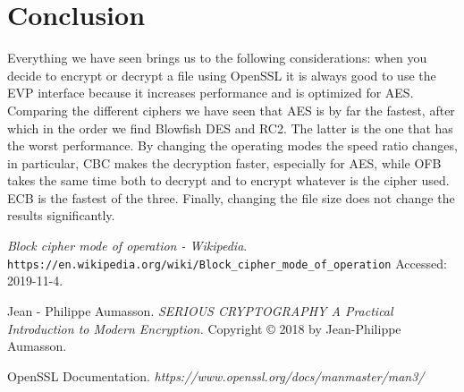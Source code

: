 \documentclass[11pt]{article}
\begin{document}
\newpage
\section{Conclusion}
Everything we have seen brings us to the following considerations: when you decide to encrypt or decrypt a file using OpenSSL it is always 
good to use the EVP interface because it increases performance and is optimized for AES.
Comparing the different ciphers we have seen that AES is by far the fastest, after which in the order we find Blowfish DES and RC2. 
The latter is the one that has the worst performance. By changing the operating modes the speed ratio changes, in particular, CBC makes 
the decryption faster, especially for AES, while OFB takes the same time both to decrypt and to encrypt whatever is the cipher used.
ECB is the fastest of the three.
Finally, changing the file size does not change the results significantly.

\begin{thebibliography}{99}

{\em Block cipher mode of operation - Wikipedia}.
  \verb|https://en.wikipedia.org/wiki/Block_cipher_mode_of_operation|
  \newblock Accessed: 2019-11-4.

Jean - Philippe Aumasson.
  {\em SERIOUS CRYPTOGRAPHY A Practical Introduction to Modern Encryption.}
  Copyright © 2018 by Jean-Philippe Aumasson.

OpenSSL Documentation. 
{\em https://www.openssl.org/docs/manmaster/man3/}

\end{thebibliography}
\end{document}
